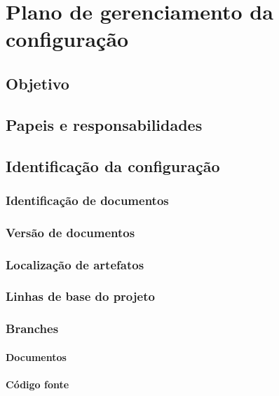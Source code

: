 \chapter{Plano de gerenciamento da configuração} %
\label{ch:configuration-management-plan}

\section{Objetivo}

\section{Papeis e responsabilidades}

\section{Identificação da configuração}

\subsection{Identificação de documentos}

\subsection{Versão de documentos}

\subsection{Localização de artefatos}

\subsection{Linhas de base do projeto}

\subsection{Branches}

\subsubsection{Documentos}

\subsubsection{Código fonte}

